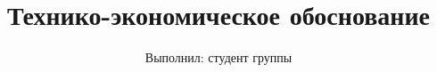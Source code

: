 

\title{Технико-экономическое обоснование}
\author{Выполнил: студент группы \mygroup{} \me{}}
\date{}



\maketitle







